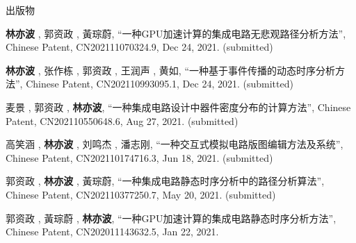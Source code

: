 \begin{rSection}{出版物}
\begin{description}[font=\normalfont, rightmargin=2em]
\item[{[P6]}]{
        \textbf{林亦波} ,  郭资政 ,  黃琮蔚, 
    ``一种GPU加速计算的集成电路无悲观路径分析方法'', 
    Chinese Patent, CN202111070324.9, Dec 24, 2021.
    (submitted)
}
            

\item[{[P5]}]{
        \textbf{林亦波} ,  张作栋 ,  郭资政 ,  王润声 ,  黄如, 
    ``一种基于事件传播的动态时序分析方法'', 
    Chinese Patent, CN202110993095.1, Dec 24, 2021.
    (submitted)
}
            

\item[{[P4]}]{
        麦景 ,  郭资政 ,  \textbf{林亦波}, 
    ``一种集成电路设计中器件密度分布的计算方法'', 
    Chinese Patent, CN202110550648.6, Aug 27, 2021.
    (submitted)
}
            

\item[{[P3]}]{
        高笑涵 ,  \textbf{林亦波} ,  刘鸣杰 ,  潘志刚, 
    ``一种交互式模拟电路版图编辑方法及系统'', 
    Chinese Patent, CN202110174716.3, Jun 18, 2021.
    (submitted)
}
            

\item[{[P2]}]{
        郭资政 ,  \textbf{林亦波} ,  黃琮蔚, 
    ``一种集成电路静态时序分析中的路径分析算法'', 
    Chinese Patent, CN202110377250.7, May 20, 2021.
    (submitted)
}
            

\item[{[P1]}]{
        郭资政 ,  黃琮蔚 ,  \textbf{林亦波}, 
    ``一种GPU加速计算的集成电路静态时序分析方法'', 
    Chinese Patent, CN202011143632.5, Jan 22, 2021.
    
}
            

\end{description}
    

\end{rSection}


